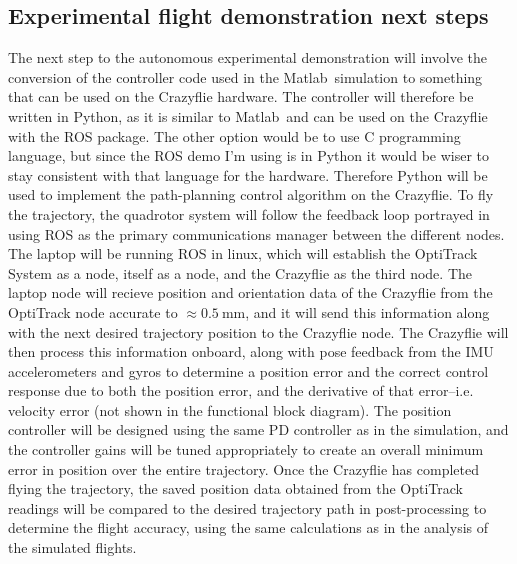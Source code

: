 \documentclass[onecolumn,10pt]{IEEEtran}
\newcommand{\MATLAB}{Matlab}
\begin{document}
\subsection{Experimental flight demonstration next steps}
The next step to the autonomous experimental demonstration will involve the conversion of the controller code used in the \MATLAB\ simulation to something that can be used on the Crazyflie hardware. The controller will therefore be written in Python, as it is similar to \MATLAB\ and can be used on the Crazyflie with the ROS package. The other option would be to use C programming language, but since the ROS demo I'm using is in Python it would be wiser to stay consistent with that language for the hardware. Therefore Python will be used to implement the path-planning control algorithm on the Crazyflie. To fly the trajectory, the quadrotor system will follow the feedback loop portrayed in  using ROS as the primary communications manager between the different nodes. The laptop will be running ROS in linux, which will establish the OptiTrack System as a node, itself as a node, and the Crazyflie as the third node. The laptop node will recieve position and orientation data of the Crazyflie from the OptiTrack node accurate to $\approx \SI{0.5}{\milli\meter}$, and it will send this information along with the next desired trajectory position to the Crazyflie node. The Crazyflie will then process this information onboard, along with pose feedback from the IMU accelerometers and gyros to determine a position error and the correct control response due to both the position error, and the derivative of that error--i.e. velocity error (not shown in the functional block diagram). The position controller will be designed using the same PD controller as in the simulation, and the controller gains will be tuned appropriately to create an overall minimum error in position over the entire trajectory. Once the Crazyflie has completed flying the trajectory, the saved position data obtained from the OptiTrack readings will be compared to the desired trajectory path in post-processing to determine the flight accuracy, using the same calculations as in the analysis of the simulated flights.
\end{document}
